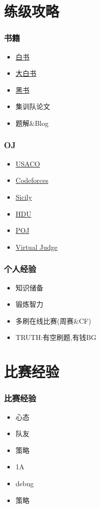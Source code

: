 \documentclass[slidestop,compress,mathserif]{beamer}
\begin{document}
  \section{练级攻略}
  \begin{frame}
    \frametitle{书籍}
    \begin{itemize}
      \item \href{http://www.amazon.cn/算法艺术与信息学竞赛•算法竞赛入门经典-刘汝佳/dp/B002WB0U4Q}{白书}
      \item \href{http://www.amazon.cn/算法竞赛入门经典-训练指南-刘汝佳/dp/B009SJJGOU}{大白书}
      \item \href{http://www.amazon.cn/算法艺术与信息学竞赛-刘汝佳/dp/B0011A1VHY}{黑书}
      \item 集训队论文
      \item 题解\&Blog
    \end{itemize}
  \end{frame}
  \begin{frame}
    \frametitle{OJ}
    \begin{itemize}
      \item \href{http://cerberus.delos.com:790/usacogate}{USACO}
      \item \href{http://codeforces.com/}{Codeforces}
      \item \href{http://soj.me}{Sicily}
      \item \href{http://acm.hdu.edu.cn/}{HDU}
      \item \href{http://poj.org/}{POJ}
      \item \href{http://acm.hust.edu.cn/vjudge}{Virtual Judge}
    \end{itemize}
  \end{frame}
  \begin{frame}
    \frametitle{个人经验}
    \begin{itemize}
        \pause \item 知识储备
        \pause \item 锻炼智力
        \pause \item 多刷在线比赛(周赛\&CF)
        \pause \item TRUTH:有空刷题,有钱BG
    \end{itemize}
  \end{frame}

  \section{比赛经验}
  \begin{frame}
    \frametitle{比赛经验}
    \begin{itemize}
        \pause \item 心态
        \pause \item 队友
        \pause \item 策略
        \pause \item 1A
        \pause \item debug
        \pause \item 策略
    \end{itemize}
  \end{frame}

  {\aauwavesbg
  \begin{frame}
  \end{frame}}
\end{document}
